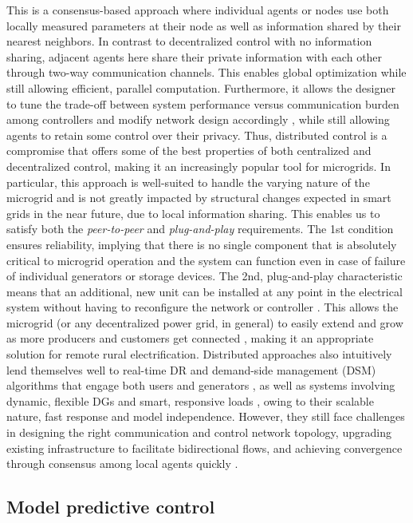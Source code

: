 \documentclass[final,3p,times]{elsarticle}
\begin{document}
This is a consensus-based approach where individual agents or nodes use both locally measured parameters at their node as well as information shared by their nearest neighbors. In contrast to decentralized control with no information sharing, adjacent agents here share their private information with each other through two-way communication channels. This enables global optimization while still allowing efficient, parallel computation. Furthermore, it allows the designer to tune the trade-off between system performance versus communication burden among controllers and modify network design accordingly \cite{farina2012}, while still allowing agents to retain some control over their privacy. Thus, distributed control is a compromise that offers some of the best properties of both centralized and decentralized control, making it an increasingly popular tool for microgrids. In particular, this approach is well-suited to handle the varying nature of the microgrid and is not greatly impacted by structural changes expected in smart grids in the near future, due to local information sharing. This enables us to satisfy both the \textit{peer-to-peer} and \textit{plug-and-play} requirements. The 1st condition ensures reliability, implying that there is no single component that is absolutely critical to microgrid operation and the system can function even in case of failure of individual generators or storage devices. The 2nd, plug-and-play characteristic means that an additional, new unit can be installed at any point in the electrical system without having to reconfigure the network or controller \cite{mg_prop}. This allows the microgrid (or any decentralized power grid, in general) to easily extend and grow as more producers and customers get connected \cite{pourbabak2017}, making it an appropriate solution for remote rural electrification. Distributed approaches also intuitively lend themselves well to real-time DR and demand-side management (DSM) algorithms that engage both users and generators \cite{deng2014}, as well as systems involving dynamic, flexible DGs and smart, responsive loads \cite{dist_1, dist_2}, owing to their scalable nature, fast response and model independence. However, they still face challenges in designing the right communication and control network topology, upgrading existing infrastructure to facilitate bidirectional flows, and achieving convergence through consensus among local agents quickly \cite{pourbabak2017}.

\subsection{Model predictive control \label{app:mpc}}
\end{document}
